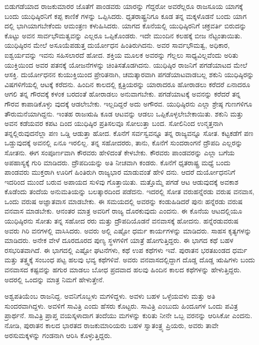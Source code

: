 ಬಿಡುಗಡೆಯಾದ ರಾಜಕುಮಾರರ ಜೊತೆಗೆ ಪಾಂಡವರು ಯಾರನ್ನು ಗೆದ್ದರೋ ಅವರೆಲ್ಲರೂ ರಾಜಸೂಯ ಯಾಗಕ್ಕೆ ಬಂದು ಯುಧಿಷ್ಠಿರನಿಗೆ ಕಪ್ಪ ಕಾಣಿಕೆ ಗಳನ್ನು ಒಪ್ಪಿಸಿದರು. ಧೃತರಾಷ್ಟ್ರನಿಗೂ ಕೂಡ ತನ್ನ ಮಕ್ಕಳೊಡನೆ ಬಂದು ಯಾಗ ದಲ್ಲಿ ಭಾಗಿಯಾಗಬೇಕೆಂದು ಆಮಂತ್ರಣ ಕಳುಹಿಸಿದರು. ಯಾಗದ ಕೊನೆಯಲ್ಲಿ ಯುಧಿಷ್ಠಿರನಿಗೆ ಚಕ್ರವರ್ತಿ ಬಿರುದನ್ನು ಕೊಟ್ಟು ಅವನ ಸಾರ್ವಭೌಮತ್ವವನ್ನು ಎಲ್ಲರೂ ಒಪ್ಪಿಕೊಂಡರು. ಇದೇ ಮುಂದಿನ ಕಲಹಕ್ಕೆ ಬೀಜ ನೆಟ್ಟಂತಾಯಿತು. ಯುಧಿಷ್ಠಿರನ ಮೇಲೆ ಅಸೂಯೆಪಡುತ್ತ ದುರ್ಯೋಧನ ಹಿಂತಿರುಗಿದನು. ಅವರ ಸಾರ್ವಭೌಮತ್ವ, ಅಧಿಕಾರ, ಐಶ್ವರ್ಯವನ್ನು ಇವನು ಸಹಿಸಲಾರದೆ ಹೋದ. ಶಕ್ತಿಯ ಮೂಲಕ ಅವರನ್ನು ಗೆಲ್ಲಲು ಸಾಧ್ಯವಿಲ್ಲವೆಂದು ಅರಿತು ಯುಕ್ತಿಯಿಂದ ಅವರ ಪತನಕ್ಕೆ ಯೋಜನೆಗಳನ್ನು ಚಿಂತಿಸತೊಡಗಿದನು. ಯುಧಿಷ್ಠಿರ ರಾಜನಿಗೆ ಪಗಡೆಯಾಟದ ಮೇಲೆ ಆಸಕ್ತಿ. ದುರ್ಯೋಧನನ ಕುಯುಕ್ತಿಯಿಂದ ಪ್ರೇರಿತನಾಗಿ, ಚಮತ್ಕಾರವಾಗಿ ಪಗಡೆಯಾಟವಾಡಬಲ್ಲ ಶಕುನಿ ಯುಧಿಷ್ಠಿರನ್ನು ವಿಷಗಳಿಗೆಯಲ್ಲಿ ಆಟಕ್ಕೆ ಕರೆದನು. ಹಿಂದಿನ ಕಾಲದಲ್ಲಿ ಕ್ಷತ್ರಿಯರನ್ನು ಯಾರಾದರೂ ಹೋರಾಡಲು ಕರೆದರೆ ಏನಾದರೂ ಆಗಲಿ ತನ್ನ ಗೌರವಕ್ಕೆ ಕಳಂಕ ಬರದಂತೆ ಹೋರಾಡಲು ಅನುವಾಗಬೇಕು. ಪಗಡೆಯಾಟಕ್ಕೆ ಅವನನ್ನು ಕರೆದರೆ ತನ್ನ ಗೌರವ ಕಾಪಾಡಿಕೊಳ್ಳು ವುದಕ್ಕೆ ಆಡಲೇಬೇಕು. ಇಲ್ಲದಿದ್ದರೆ ಅದು ಅಗೌರವ. ಯುಧಿಷ್ಠಿರನು ಎಲ್ಲಾ ಶ್ರೇಷ್ಠ ಗುಣಗಳಿಗೂ ತೌರುಮನೆಯಾಗಿದ್ದನು. ಇಂತಹ ರಾಜಋಷಿ ಕೂಡ ಆಟವನ್ನು ಆಡಲು ಒಪ್ಪಿಕೊಳ್ಳಲೇಬೇಕಾಯಿತು. ಶಕುನಿ ಮತ್ತು ಅವನ ಕಡೆಯವರ ಕಪಟ ದಿಂದ ಯುಧಿಷ್ಠಿರ ಪ್ರತಿಸಲವೂ ಸೋಲುತ್ತಾ ಬಂದ. ಸೋಲಿನಿಂದ ಉನ್ಮತ್ತನಾಗಿ ತನ್ನಲ್ಲಿರುವುದನೆಲ್ಲಾ ಪಣ ಒಡ್ಡಿ ಆಡುತ್ತಾ ಹೋದ. ಕೊನೆಗೆ ಸರ್ವಸ್ವವನ್ನೂ ತನ್ನ ರಾಜ್ಯವನ್ನೂ ಸೋತ. ಕಟ್ಟಕಡೆಗೆ ಪಣ ಒಡ್ಡುವುದಕ್ಕೆ ಅವನಲ್ಲಿ ಏನೂ ಇರಲಿಲ್ಲ. ತನ್ನ ಸಹೋದರರು, ತಾನು, ಕೊನೆಗೆ ಸುಂದರಾಂಗನೆ ದ್ರೌಪದಿ ಎಲ್ಲರನ್ನು ಸೋತನು. ಈಗ ಸಂಪೂರ್ಣವಾಗಿ ಕೌರವರು ಹೇಳಿದಂತೆ ಕೇಳಬೇಕು. ಕೌರವರು ಪಾಂಡವರನ್ನು ಎಲ್ಲಾ ಬಗೆಯ ಅಪಹಾಸ್ಯಕ್ಕೆ ಗುರಿ ಮಾಡಿದರು. ದ್ರೌಪದಿಯನ್ನು ಅತಿ ನೀಚವಾಗಿ ಕಂಡರು. ಕೊನೆಗೆ ಧೃತರಾಷ್ಟ್ರ ಮಧ್ಯೆ ಬಂದು ಪಾಂಡವರು ಮುಕ್ತರಾಗಿ ಊರಿಗೆ ಹಿಂತಿರುಗಿ ರಾಜ್ಯಭಾರ ಮಾಡುವಂತೆ ಹೇಳಿ ದನು. ಆದರೆ ದುರ್ಯೋಧನನಿಗೆ ಇದರಿಂದ ಮುಂದೆ ಬರುವ ಅಪಾಯದ ಸುಳಿವು ಗೊತ್ತಾಯಿತು. ಮತ್ತೊಮ್ಮೆ ಪಗಡೆ ಆಟ ಆಡುವುದಕ್ಕೆ ಅವಕಾಶ ಕೊಡೆಂದು ತಂದೆಯ ಅನುಮತಿಯನ್ನು ಬಲತ್ಕಾರದಿಂದ ಪಡೆದನು. ಇದರಲ್ಲಿ ಸೋತ ವರುಹನ್ನೆರಡು ವರುಷ ವನವಾಸ, ಒಂದು ವರುಷ ಅಜ್ಞಾತವಾಸ ಮಾಡಬೇಕು. ಈ ಸಮಯದಲ್ಲಿ ಅವರನ್ನು ಕಂಡುಹಿಡಿದರೆ ಪುನಃ ಹನ್ನೆರಡು ವರುಷ ವನವಾಸ ಮಾಡಬೇಕು. ಆನಂತರ ಮಾತ್ರ ಅವರಿಗೆ ರಾಜ್ಯ ದೊರಕುವುದು ಎಂದನು. ಈ ಕೊನೆಯ ಆಟದಲ್ಲಿಯೂ ಯುಧಿಷ್ಠಿರನು ಸೋತು ತನ್ನ ಸಹೋದ ರರು ಮತ್ತು ದ್ರೌಪದಿಯೊಡನೆ ವನವಾಸಕ್ಕೆ ಹೋದನು. ಹನ್ನೆರಡುವರುಷ ಅವರು ಗಿರಿ ವನಗಳಲ್ಲಿ ವಾಸಿಸಿದರು. ಅವರು ಅಲ್ಲಿ ಎಷ್ಟೋ ಧರ್ಮ ಕಾರ್ಯಗಳನ್ನು ಮಾಡಿದರು. ಸಾಹಸ ಕೃತ್ಯಗಳನ್ನು ಮಾಡಿದರು. ಅನೇಕ ವೇಳೆ ದೂರದೂರದ ಪುಣ್ಯ ಸ್ಥಳಗಳಿಗೆ ಯಾತ್ರೆ ಹೋಗುತ್ತಿದ್ದರು. ಈ ಭಾಗದ ಕಥೆ ಬಹಳ ರಸಭರಿತವಾಗಿದೆ. ಈ ಭಾಗದಲ್ಲಿ ಎಷ್ಟೋ ಘಟನೆಗಳು, ಕಥೆ ಉಪ ಕಥೆಗಳು ಇವೆ. ಪುರಾತನ ಭರತಖಂಡದ ಧರ್ಮ ಮತ್ತು ತತ್ತ್ವಕ್ಕೆ ಸಂಬಂಧ ಪಟ್ಟ ಹಲವು ಭವ್ಯ ಕಥೆಗಳಿವೆ. ಅವರು ವನವಾಸದಲ್ಲಿದ್ದಾಗ ದೊಡ್ಡ ದೊಡ್ಡ ಋಷಿಗಳು ಬಂದು ವನವಾಸದ ಕಷ್ಟವನ್ನು ಹಗುರ ಮಾಡಲು ಬೋಧ ಪ್ರದವಾದ ಹಲವು ಹಿಂದಿನ ಕಾಲದ ಕಥೆಗಳನ್ನು ಹೇಳುತ್ತಿದ್ದರು. ಅದರಲ್ಲಿ ಒಂದನ್ನು ಮಾತ್ರ ನಿಮಗೆ ಹೇಳುತ್ತೇನೆ.

ಅಶ್ವಪತಿಯೆಂಬ ರಾಜನಿದ್ದ. ಅವನಿಗೊಬ್ಬಳು ಮಗಳಿದ್ದಳು. ಅವಳು ಬಹಳ ಒಳ್ಳೆಯವಳು ಮತ್ತು ಅತಿ ಸುಂದರವಾಗಿದ್ದಳು. ಅವಳಿಗೆ ಸಾವಿತ್ರಿ ಎಂದು ಹೆಸರು ಕೊಟ್ಟರು. ಸಾವಿತ್ರಿ ಎಂಬುದು ಹಿಂದೂಗಳ ಒಂದು ಪವಿತ್ರ ಪ್ರಾರ್ಥನೆ. ಸಾವಿತ್ರಿ ಪ್ರಾಪ್ತ ವಯಸ್ಕಳಾದಾಗ ತಂದೆಯು ಮಗಳನ್ನು ಕುರಿತು ನೀನೇ ಒಬ್ಬ ವರನನ್ನು ಆರಿಸಿಕೋ ಎಂದನು. ನೋಡಿ, ಪುರಾತನ ಕಾಲದ ಭಾರತದ ರಾಜಕುಮಾರಿಯರು ಬಹಳ ಸ್ವಾತಂತ್ರ್ಯ ಪ್ರಿಯರು, ಅವರು ತಾವೇ ಅರಸುಮಕ್ಕಳನ್ನು ಗಂಡನಾಗಿ ಆರಿಸಿ ಕೊಳ್ಳುತ್ತಿದ್ದರು.

